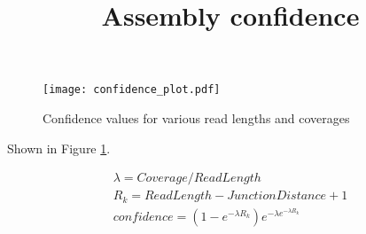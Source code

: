 \documentclass{article}
\title{Assembly confidence}
\begin{document}
\begin{figure}[ht]
\centering
\texttt{[image: confidence\_plot.pdf]}
\caption{Confidence values for various read lengths and coverages}
\label{fig:contig_conf_values_plot}
\end{figure}

Shown in Figure \ref{fig:contig_conf_values_plot}.

\begin{gather*}
\lambda = Coverage / ReadLength \\
R_k = ReadLength - JunctionDistance + 1 \\
confidence = \left(1 - e^{-\lambda R_k}\right) e^{-\lambda e^{-\lambda R_k}}
\end{gather*}
\end{document}
